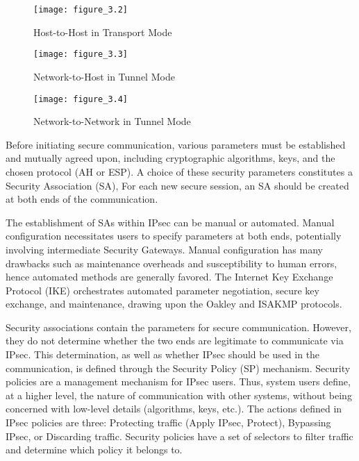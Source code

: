 \begin{figure}[h!]
\centering
\texttt{[image: figure\_3.2]}\\
\caption{Host-to-Host in Transport Mode}
\label{fig:figure3.2}
\end{figure}

\begin{figure}[h!]
\centering
\texttt{[image: figure\_3.3]}\\
\caption{Network-to-Host in Tunnel Mode}
\label{fig:figure3.3}
\end{figure}


\begin{figure}[h!]
\centering
\texttt{[image: figure\_3.4]}\\
\caption{ Network-to-Network in Tunnel Mode}
\label{fig:figure3.4}
\end{figure}


Before initiating secure communication, various parameters must be established and mutually agreed upon, including cryptographic algorithms, keys, and the chosen protocol (AH or ESP). A choice of these security parameters constitutes a Security Association (SA), For each new secure session, an SA should be created at both ends of the communication.

The establishment of SAs within IPsec can be manual or automated. Manual configuration necessitates users to specify parameters at both ends, potentially involving intermediate Security Gateways. Manual configuration has many drawbacks such as maintenance overheads and susceptibility to human errors, hence automated methods are generally favored. The Internet Key Exchange Protocol (IKE) orchestrates automated parameter negotiation, secure key exchange, and maintenance, drawing upon the Oakley and ISAKMP protocols.

Security associations contain the parameters for secure communication. However, they do not determine whether the two ends are legitimate to communicate via IPsec. This determination, as well as whether IPsec should be used in the communication, is defined through the Security Policy (SP) mechanism. Security policies are a management mechanism for IPsec users. Thus, system users define, at a higher level, the nature of communication with other systems, without being concerned with low-level details (algorithms, keys, etc.). The actions defined in IPsec policies are three: Protecting traffic (Apply IPsec, Protect), Bypassing IPsec, or Discarding traffic. Security policies have a set of selectors to filter traffic and determine which policy it belongs to.

